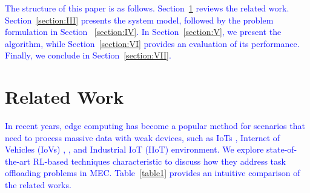 \documentclass[10pt, journal,letterpaper]{IEEEtran}
\begin{document}
 \textcolor{blue}{The structure of this paper is as follows. Section~\ref{section:II} reviews the related work. Section~\ref{section:III} presents the system model, followed by the problem formulation in Section ~\ref{section:IV}. In Section~\ref{section:V}, we present the algorithm, while Section~\ref{section:VI} provides an evaluation of its performance. Finally, we conclude in Section~\ref{section:VII}.}


\section{Related Work}
\label{section:II}
 \textcolor{blue}{In recent years, edge computing has become a popular method for scenarios that need to process massive data with weak devices, such as IoTs \cite{zhang2023multi}, Internet of Vehicles (IoVs) \cite{lin2022multi}, \cite{wei2023many}, and Industrial IoT (IIoT) \cite{yuan2023adaptive} environment.
We explore state-of-the-art RL-based techniques characteristic to discuss how they address task offloading problems in MEC. Table~\ref{table1} provides an intuitive comparison of the related works.}
\end{document}

